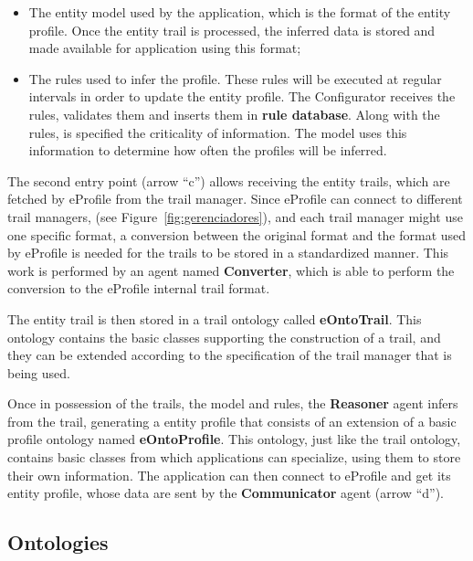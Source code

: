 \documentclass{svjour3}                     %
\begin{document}
\begin{itemize}

\item The entity model used by the application, which is the format of the entity profile. Once the entity trail is processed, the inferred data is stored and made available for application using this format;

\item  The rules used to infer the profile. These rules will be executed at
	regular intervals in order to update the entity profile. The
	Configurator receives the rules, validates them and inserts them in
	\textbf{rule database}. Along with the rules, is specified the
	criticality of information. The model uses this information to determine
	how often the profiles will be inferred.

\end{itemize}

The second entry point (arrow ``c'') allows receiving the entity trails, which are fetched by eProfile from the trail manager. Since eProfile can connect to different trail managers, (see Figure~\ref{fig:gerenciadores}), and each trail manager might use one specific format, a conversion between the original format and the format used by eProfile is needed for the trails to be stored in a standardized manner. This work is performed by an agent named {\bf Converter}, which is able to perform the conversion to the eProfile internal trail format.

The entity trail is then stored in a trail ontology called {\bf eOntoTrail}. This ontology contains the basic classes supporting the construction of a trail, and they can be extended according to the specification of the trail manager that is being used.

Once in possession of the trails, the model and rules, the \textbf{Reasoner} agent infers from the trail, generating a entity profile that consists of an extension of a basic profile ontology named {\bf eOntoProfile}. This ontology, just like the trail ontology, contains basic classes from which applications can specialize, using them to store their own information. The application can then connect to eProfile and get its entity profile, whose data are sent by the \textbf{Communicator} agent (arrow ``d'').





\subsection{Ontologies}
\label{sec:ontologias}
\end{document}
